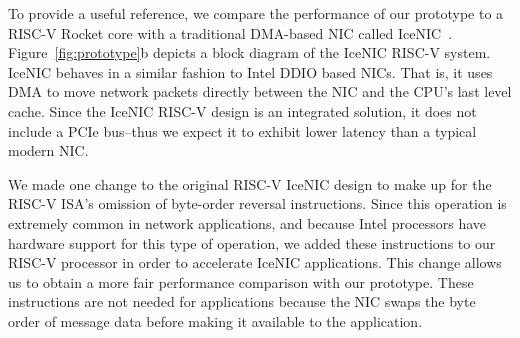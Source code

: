 To provide a useful reference, we compare the performance of our \name{} prototype to a RISC-V Rocket core with a traditional DMA-based NIC called IceNIC~\cite{firesim}.
Figure~\ref{fig:prototype}b depicts a block diagram of the IceNIC RISC-V system.
IceNIC behaves in a similar fashion to Intel DDIO based NICs.
That is, it uses DMA to move network packets directly between the NIC and the CPU's last level cache.
Since the IceNIC RISC-V design is an integrated solution, it does not include a PCIe bus--thus we expect it to exhibit lower latency than a typical modern NIC.

We made one change to the original RISC-V IceNIC design to make up for the RISC-V ISA's omission of byte-order reversal instructions. Since this operation is extremely common in network applications, and because Intel processors have hardware support for this type of operation, we added these instructions to our RISC-V processor in order to accelerate IceNIC applications. This change allows us to obtain a more fair performance comparison with our \name{} prototype. These instructions are not needed for \name{} applications because the NIC swaps the byte order of message data before making it available to the application.
